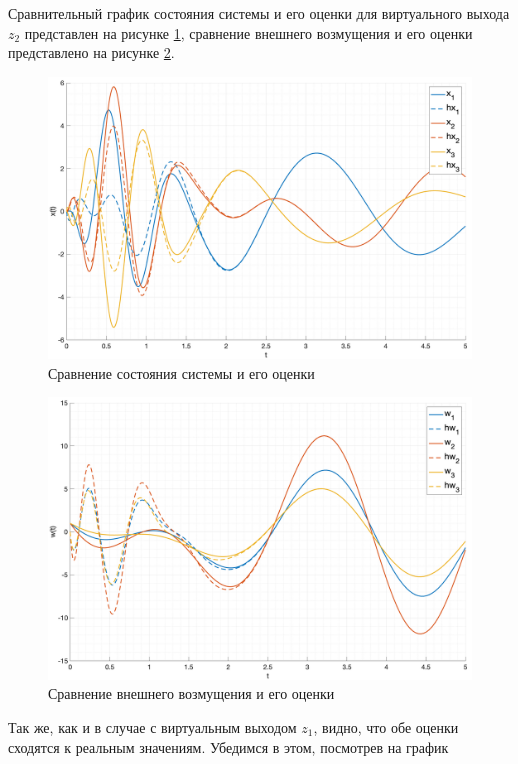 \FloatBarrier
Сравнительный график состояния системы и его оценки для виртуального выхода $z_2$
представлен на рисунке \ref{fig:task3_z2_x_cmp}, сравнение внешнего возмущения
и его оценки представлено на рисунке \ref{fig:task3_z2_w_cmp}.
\begin{figure}[ht!]
    \centering
    \includegraphics[width=\textwidth]{media/plots/task3_z2_x_cmp.png}
    \caption{Сравнение состояния системы и его оценки}
    \label{fig:task3_z2_x_cmp}
\end{figure}
\begin{figure}[ht!]
    \centering
    \includegraphics[width=\textwidth]{media/plots/task3_z2_w_cmp.png}
    \caption{Сравнение внешнего возмущения и его оценки}
    \label{fig:task3_z2_w_cmp}
\end{figure}
Так же, как и в случае с виртуальным выходом $z_1$, видно, что обе оценки сходятся к реальным значениям.
Убедимся в этом, посмотрев на график
